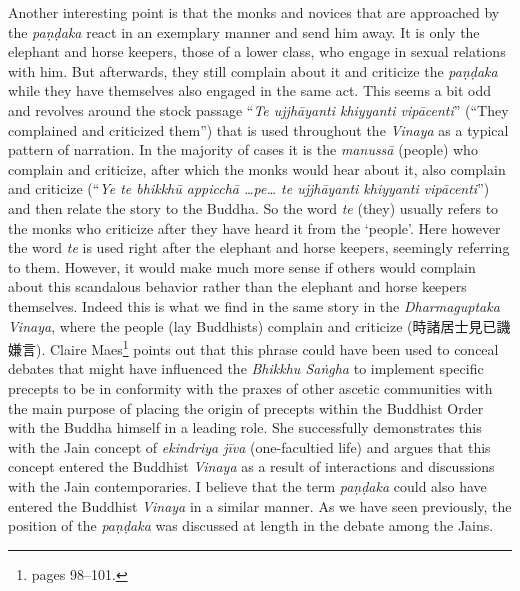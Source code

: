 Another interesting point is that the monks and novices that are approached by the \textit{paṇḍaka} react in an exemplary manner and send him away. It is only the elephant and horse keepers, those of a lower class, who engage in sexual relations with him. But afterwards, they still complain about it and criticize the \textit{paṇḍaka} while they have themselves also engaged in the same act. This seems a bit odd and revolves around the stock passage ``\textit{Te ujjhāyanti khiyyanti vipācenti}'' (``They complained and criticized them'') that is used throughout the \textit{Vinaya} as a typical pattern of narration. In the majority of cases it is the \textit{manussā} (people) who complain and criticize, after which the monks would hear about it, also complain and criticize (``\textit{Ye te bhikkhū appicchā …pe… te ujjhāyanti khiyyanti vipācenti}'') and then relate the story to the Buddha. So the word \textit{te} (they) usually refers to the monks who criticize after they have heard it from the `people'. Here however the word \textit{te} is used right after the elephant and horse keepers, seemingly referring to them. However, it would make much more sense if others would complain about this scandalous behavior rather than the elephant and horse keepers themselves. Indeed this is what we find in the same story in the \textit{Dharmaguptaka} \textit{Vinaya}, where the people (lay Buddhists) complain and criticize (時諸居士見已譏嫌言). Claire Maes\footnote{\cite{maes2011} pages 98–101.} points out that this phrase could have been used to conceal debates that might have influenced the \textit{Bhikkhu Saṅgha} to implement specific precepts to be in conformity with the praxes of other ascetic communities with the main purpose of placing the origin of precepts within the Buddhist Order with the Buddha himself in a leading role. She successfully demonstrates this with the Jain concept of \textit{ekindriya jīva} (one-facultied life) and argues that this concept entered the Buddhist \textit{Vinaya} as a result of interactions and discussions with the Jain contemporaries. I believe that the term \textit{paṇḍaka} could also have entered the Buddhist \textit{Vinaya} in a similar manner. As we have seen previously, the position of the \textit{paṇḍaka} was discussed at length in the debate among the Jains.

